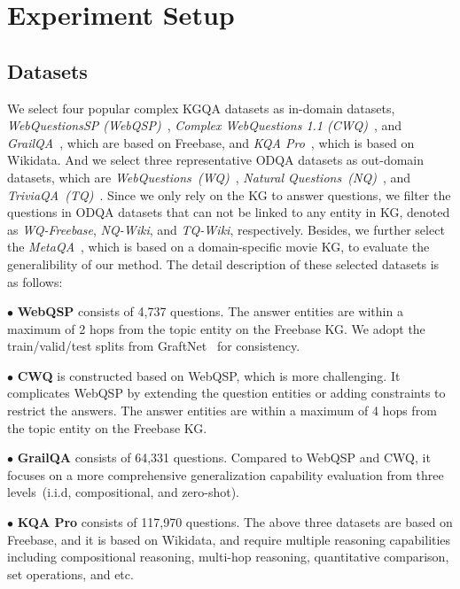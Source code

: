\clearpage
\appendix
\label{appendix}

\section{Experiment Setup}
\label{sec:app-experiment}
\subsection{Datasets} 
We select four popular complex KGQA datasets as in-domain datasets, \ie \textit{WebQuestionsSP (WebQSP)}~\cite{WebQSP}, \textit{Complex WebQuestions 1.1 (CWQ)}~\citep{CWQ}, and \textit{GrailQA}~\citep{GrailQA}, which are based on Freebase, and \textit{KQA Pro}~\cite{KQA-Pro}, which is based on Wikidata.
And we select three representative ODQA datasets as out-domain datasets, which are \textit{WebQuestions~(WQ)}~\cite{Berant-WQ-ACL-13}, \textit{Natural Questions~(NQ)}~\cite{Chen-NQ-ACL-17}, and \textit{TriviaQA~(TQ)}~\cite{Joshi-TQ-ACL-17}. Since we only rely on the KG to answer questions, we filter the questions in ODQA datasets that can not be linked to any entity in KG, denoted as \textit{WQ-Freebase}, \textit{NQ-Wiki}, and \textit{TQ-Wiki}, respectively.
Besides, we further select the \textit{MetaQA}~\cite{zhang-aaai-18}, which is based on a domain-specific movie KG, to evaluate the generalibility of our method.
The detail description of these selected datasets is as follows:

$\bullet$ \textbf{WebQSP} consists of 4,737 questions. The answer entities are within a maximum of 2 hops from the topic entity on the Freebase KG. We adopt the train/valid/test splits from GraftNet~\citep{GraftNet} for consistency.

$\bullet$ \textbf{CWQ} is constructed based on WebQSP, which is more challenging. It complicates WebQSP by extending the question entities or adding constraints to restrict the answers. The answer entities are within a maximum of 4 hops from the topic entity on the Freebase KG.

$\bullet$ \textbf{GrailQA} consists of 64,331 questions. Compared to WebQSP and CWQ, it focuses on a more comprehensive generalization capability evaluation from three levels~(\ie i.i.d, compositional, and zero-shot).

$\bullet$ \textbf{KQA Pro} consists of 117,970 questions. The above three datasets are based on Freebase, and it is based on Wikidata, and require multiple reasoning capabilities including compositional reasoning, multi-hop reasoning, quantitative comparison, set operations, and etc.

